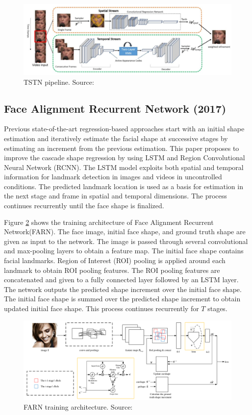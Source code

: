 \documentclass{llncs}
\begin{document}
\begin{figure}
\centering
\includegraphics[scale=0.5]{Media/TSTN}
\caption{TSTN pipeline. Source:\cite{tstn}}
\label{TSTN}
\end{figure}

\subsection{Face Alignment Recurrent Network (2017) \cite{farn}}

Previous state-of-the-art regression-based approaches start with an initial shape estimation and iteratively estimate the facial shape at successive stages by estimating an increment from the previous estimation. This paper proposes to improve the cascade shape regression by using LSTM and Region Convolutional Neural Network (RCNN). The LSTM model exploits both spatial and temporal information for landmark detection in images and videos in uncontrolled conditions. The predicted landmark location is used as a basis for estimation in the next stage and frame in spatial and temporal dimensions. The process continues recurrently until the face shape is finalized. 

Figure \ref{farn_training} shows the training architecture of Face Alignment Recurrent Network(FARN). The face image, initial face shape, and ground truth shape are given as input to the network. The image is passed through several convolutional and max-pooling layers to obtain a feature map. The initial face shape contains facial landmarks. Region of Interest (ROI) pooling is applied around each landmark to obtain ROI pooling features. The ROI pooling features are concatenated and given to a fully connected layer followed by an LSTM layer. The network outputs the predicted shape increment over the initial face shape. The initial face shape is summed over the predicted shape increment to obtain updated initial face shape. This process continues recurrently for $T$ stages.

\begin{figure}
\centering
\includegraphics[scale=0.3]{Media/farn_training2}
\caption{FARN training architecture. Source:\cite{farn}}
\label{farn_training}
\end{figure}
\end{document}
